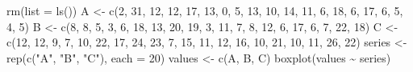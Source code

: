 \documentclass[a4paper,12pt,oneside]{book}
\newenvironment{Shaded}{\begin{snugshade}}{\end{snugshade}}
\newcommand{\DecValTok}[1]{#1}
\newcommand{\SpecialCharTok}[1]{#1}
\newcommand{\StringTok}[1]{#1}
\newcommand{\OtherTok}[1]{#1}
\newcommand{\FunctionTok}[1]{#1}
\newcommand{\AttributeTok}[1]{#1}
\newcommand{\NormalTok}[1]{#1}
\begin{document}
\begin{Shaded}
\begin{Highlighting}[]
\FunctionTok{rm}\NormalTok{(}\AttributeTok{list =} \FunctionTok{ls}\NormalTok{())}
\NormalTok{A }\OtherTok{\textless{}{-}} \FunctionTok{c}\NormalTok{(}\DecValTok{2}\NormalTok{, }\DecValTok{31}\NormalTok{, }\DecValTok{12}\NormalTok{, }\DecValTok{12}\NormalTok{, }\DecValTok{17}\NormalTok{, }\DecValTok{13}\NormalTok{, }\DecValTok{0}\NormalTok{, }\DecValTok{5}\NormalTok{, }\DecValTok{13}\NormalTok{, }\DecValTok{10}\NormalTok{,}
       \DecValTok{14}\NormalTok{, }\DecValTok{11}\NormalTok{, }\DecValTok{6}\NormalTok{, }\DecValTok{18}\NormalTok{, }\DecValTok{6}\NormalTok{, }\DecValTok{17}\NormalTok{,  }\DecValTok{6}\NormalTok{, }\DecValTok{5}\NormalTok{, }\DecValTok{4}\NormalTok{, }\DecValTok{5}\NormalTok{)}
\NormalTok{B }\OtherTok{\textless{}{-}} \FunctionTok{c}\NormalTok{(}\DecValTok{8}\NormalTok{, }\DecValTok{8}\NormalTok{, }\DecValTok{5}\NormalTok{, }\DecValTok{3}\NormalTok{, }\DecValTok{6}\NormalTok{, }\DecValTok{18}\NormalTok{, }\DecValTok{13}\NormalTok{, }\DecValTok{20}\NormalTok{, }\DecValTok{19}\NormalTok{, }\DecValTok{3}\NormalTok{,}
       \DecValTok{11}\NormalTok{, }\DecValTok{7}\NormalTok{, }\DecValTok{8}\NormalTok{, }\DecValTok{12}\NormalTok{, }\DecValTok{6}\NormalTok{, }\DecValTok{17}\NormalTok{, }\DecValTok{6}\NormalTok{, }\DecValTok{7}\NormalTok{,  }\DecValTok{22}\NormalTok{, }\DecValTok{18}\NormalTok{)}
\NormalTok{C }\OtherTok{\textless{}{-}} \FunctionTok{c}\NormalTok{(}\DecValTok{12}\NormalTok{, }\DecValTok{12}\NormalTok{, }\DecValTok{9}\NormalTok{, }\DecValTok{7}\NormalTok{, }\DecValTok{10}\NormalTok{, }\DecValTok{22}\NormalTok{, }\DecValTok{17}\NormalTok{, }\DecValTok{24}\NormalTok{, }\DecValTok{23}\NormalTok{, }\DecValTok{7}\NormalTok{,}
       \DecValTok{15}\NormalTok{, }\DecValTok{11}\NormalTok{, }\DecValTok{12}\NormalTok{, }\DecValTok{16}\NormalTok{, }\DecValTok{10}\NormalTok{, }\DecValTok{21}\NormalTok{, }\DecValTok{10}\NormalTok{, }\DecValTok{11}\NormalTok{, }\DecValTok{26}\NormalTok{, }\DecValTok{22}\NormalTok{)}
\NormalTok{series }\OtherTok{\textless{}{-}} \FunctionTok{rep}\NormalTok{(}\FunctionTok{c}\NormalTok{(}\StringTok{"A"}\NormalTok{, }\StringTok{"B"}\NormalTok{, }\StringTok{"C"}\NormalTok{), }\AttributeTok{each =} \DecValTok{20}\NormalTok{)}
\NormalTok{values }\OtherTok{\textless{}{-}} \FunctionTok{c}\NormalTok{(A, B, C)}
\FunctionTok{boxplot}\NormalTok{(values }\SpecialCharTok{\textasciitilde{}}\NormalTok{ series)}
\end{Highlighting}
\end{Shaded}
\end{document}
